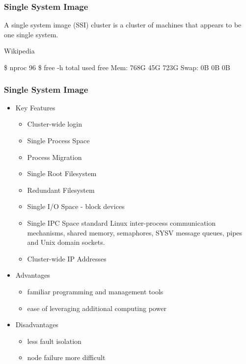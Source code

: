 \documentclass{beamer}
\begin{document}
\begin{frame}[fragile]
\frametitle{Single System Image}
\begin{definition}
A single system image (SSI) cluster is a cluster of machines that appears to be one single system.

\hfill Wikipedia
\end{definition}
\begin{center}
\end{center}
\begin{semiverbatim}
\$ nproc
96
\$ free -h
              total        used        free
Mem:           768G         45G        723G
Swap:            0B          0B          0B

\end{semiverbatim}
\end{frame}

\begin{frame}
\frametitle{Single System Image}

\begin{itemize}
\item Key Features
\begin{itemize}
\item Cluster-wide login
\item Single Process Space
\item Process Migration
\item Single Root Filesystem
\item Redundant Filesystem
\item Single I/O Space - block devices
\item Single IPC Space
standard Linux inter-process communication mechanisms, shared memory, semaphores, SYSV message queues, pipes and Unix domain sockets.
\item Cluster-wide IP Addresses
\end{itemize}
\item Advantages
\begin{itemize}
\item familiar programming and management tools
\item ease of leveraging additional computing power
\end{itemize}
\item Disadvantages
\begin{itemize}
\item less fault isolation
\item node failure more difficult
\end{itemize}
\end{itemize}
\end{frame}
\end{document}

